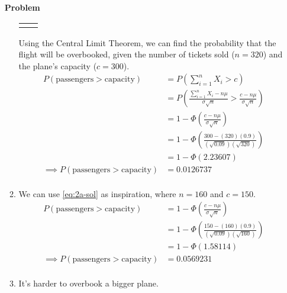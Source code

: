 \documentclass[12pt]{article}
\newenvironment{Ex}{\textbf{Problem}\vspace{.75em}\\}{}
\begin{document}
\begin{enumerate}
\begin{Ex}
\begin{solution}
\begin{enumerate}
\begin{table}[H]
\begin{tabularx}{\linewidth}{XX}
\begin{equation}
            \end{equation}
          \end{tabularx}
        \end{table}
        Using the Central Limit Theorem, we can find the probability
        that the flight will be overbooked, given the number of
        tickets sold ($n=320$) and the plane's capacity ($c=300$).
        \begin{equation}
          \label{eq:2a-sol}
          \begin{aligned}
            P(\text{passengers} > \text{capacity}) &=
            P\left(\sum_{i=1}^{n}X_i > c\right) \\
            &= P\left(\frac{\sum_{i=1}^{n}X_i - n\mu}{\sigma\sqrt{n}} >
              \frac{c-n\mu}{\sigma\sqrt{n}}\right) \\
            &= 1 - \Phi\left(\frac{c-n\mu}{\sigma\sqrt{n}}\right) \\
            &= 1 - \Phi\left(\frac{300-(320)(0.9)}
              {(\sqrt{0.09})(\sqrt{320})}\right) \\
            &= 1-\Phi(2.23607) \\
            \implies P(\text{passengers} > \text{capacity}) &= 0.0126737 \\
          \end{aligned}
        \end{equation}
      \item We can use \cref{eq:2a-sol} as inspiration, where $n=160$
        and $c=150$.
        \begin{equation}
          \label{eq:2b-sol}
          \begin{aligned}
            P(\text{passengers} > \text{capacity})
            &= 1 - \Phi\left(\frac{c-n\mu}{\sigma\sqrt{n}}\right) \\
            &= 1 - \Phi\left(\frac{150-(160)(0.9)}
              {(\sqrt{0.09})(\sqrt{160})}\right) \\
            &= 1 - \Phi(1.58114) \\
            \implies P(\text{passengers} > \text{capacity}) &=
            0.0569231 \\
          \end{aligned}
        \end{equation}
      \item It's harder to overbook a bigger plane.
      \end{enumerate}
    \end{solution}
  \end{Ex}


\end{enumerate}
\end{document}
